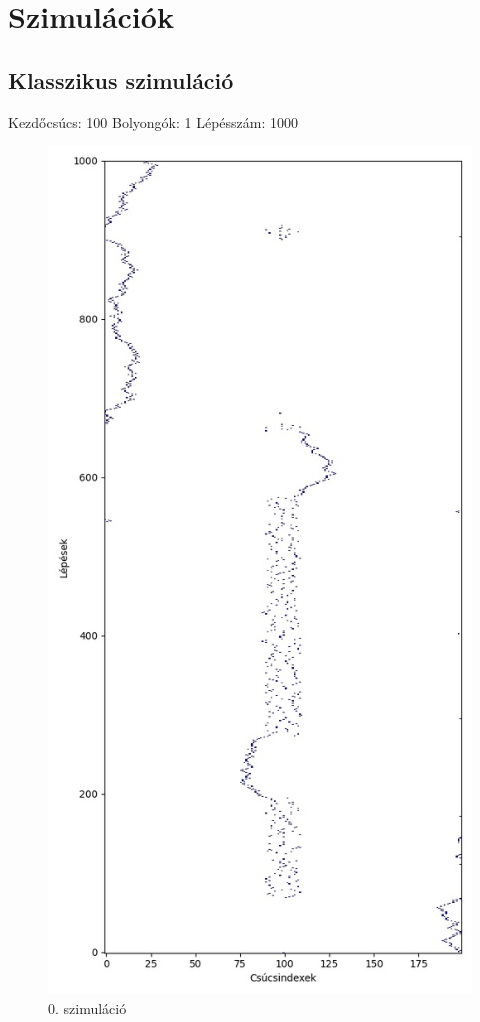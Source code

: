 \documentclass[14pt,a4paper]{article}
\begin{document}
\section{Szimulációk}
\subsection{Klasszikus szimuláció}
Kezdőcsúcs: 100
Bolyongók: 1
Lépésszám: 1000
\begin{figure}[H]
\centering
\includegraphics[width = 0.7\columnwidth]{sim00.jpg}
\caption{0. szimuláció}
\end{figure}
\end{document}
